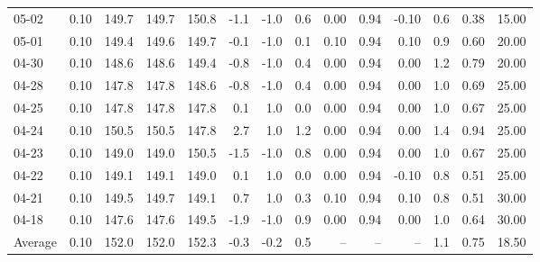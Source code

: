 \begin{threeparttable}
{\begin{tabular}{lrrrrrrrrrrrrr}
  05-02 &     0.10 & 149.7 & 149.7 & 150.8 &       -1.1 &                     -1.0 &                 0.6 &       0.00 &      0.94 &          -0.10 &              0.6 &            0.38 &                  15.00 \\
  05-01 &     0.10 & 149.4 & 149.6 & 149.7 &       -0.1 &                     -1.0 &                 0.1 &       0.10 &      0.94 &           0.10 &              0.9 &            0.60 &                  20.00 \\
  04-30 &     0.10 & 148.6 & 148.6 & 149.4 &       -0.8 &                     -1.0 &                 0.4 &       0.00 &      0.94 &           0.00 &              1.2 &            0.79 &                  20.00 \\
  04-28 &     0.10 & 147.8 & 147.8 & 148.6 &       -0.8 &                     -1.0 &                 0.4 &       0.00 &      0.94 &           0.00 &              1.0 &            0.69 &                  25.00 \\
  04-25 &     0.10 & 147.8 & 147.8 & 147.8 &        0.1 &                      1.0 &                 0.0 &       0.00 &      0.94 &           0.00 &              1.0 &            0.67 &                  25.00 \\
  04-24 &     0.10 & 150.5 & 150.5 & 147.8 &        2.7 &                      1.0 &                 1.2 &       0.00 &      0.94 &           0.00 &              1.4 &            0.94 &                  25.00 \\
  04-23 &     0.10 & 149.0 & 149.0 & 150.5 &       -1.5 &                     -1.0 &                 0.8 &       0.00 &      0.94 &           0.00 &              1.0 &            0.67 &                  25.00 \\
  04-22 &     0.10 & 149.1 & 149.1 & 149.0 &        0.1 &                      1.0 &                 0.0 &       0.00 &      0.94 &          -0.10 &              0.8 &            0.51 &                  25.00 \\
  04-21 &     0.10 & 149.5 & 149.7 & 149.1 &        0.7 &                      1.0 &                 0.3 &       0.10 &      0.94 &           0.10 &              0.8 &            0.51 &                  30.00 \\
  04-18 &     0.10 & 147.6 & 147.6 & 149.5 &       -1.9 &                     -1.0 &                 0.9 &       0.00 &      0.94 &           0.00 &              1.0 &            0.64 &                  30.00 \\
Average &     0.10 & 152.0 & 152.0 & 152.3 &       -0.3 &                     -0.2 &                 0.5 &         -- &        -- &             -- &              1.1 &            0.75 &                  18.50 \\

\end{tabular}}
\end{threeparttable}
